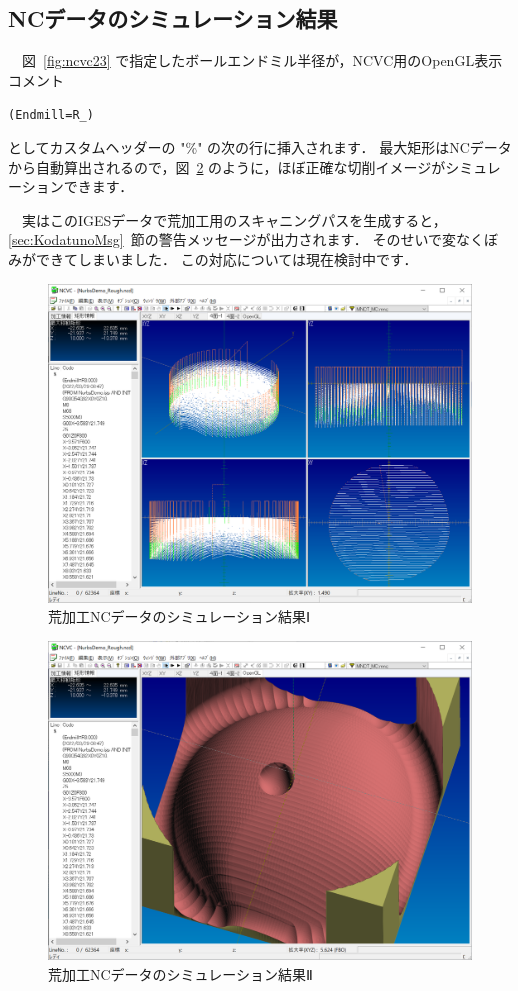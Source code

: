 \subsection{NCデータのシミュレーション結果}
　図~\ref{fig:ncvc23} で指定したボールエンドミル半径が，NCVC用のOpenGL表示コメント

\vspace*{0.5zh}
\begin{breakbox}
\vspace*{-0.25cm}
\small
\begin{alltt}
(Endmill=R_)
\end{alltt}
\vspace*{-0.1cm}
\end{breakbox}

としてカスタムヘッダーの "\%" の次の行に挿入されます．
最大矩形はNCデータから自動算出されるので，図~\ref{fig:ncvc29} のように，ほぼ正確な切削イメージがシミュレーションできます．

　実はこのIGESデータで荒加工用のスキャニングパスを生成すると，\ref{sec:KodatunoMsg}~節の警告メッセージが出力されます．
そのせいで変なくぼみができてしまいました．
この対応については現在検討中です．

\begin{figure}[H]
\centering
\includegraphics[scale=0.5]{No2/fig/fig28.png}
\caption{荒加工NCデータのシミュレーション結果Ⅰ}
\label{fig:ncvc28}
\end{figure}

\begin{figure}[H]
\centering
\includegraphics[scale=0.5]{No2/fig/fig29.png}
\caption{荒加工NCデータのシミュレーション結果Ⅱ}
\label{fig:ncvc29}
\end{figure}
